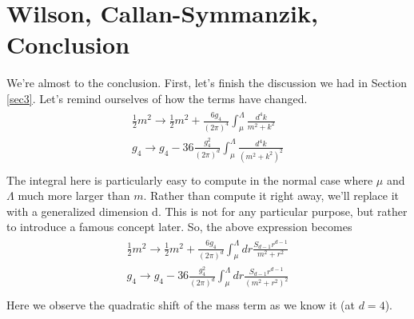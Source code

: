 \documentclass[12pt,halfline,a4paper]{ouparticle}
\begin{document}
\section{Wilson, Callan-Symmanzik, Conclusion}
We're almost to the conclusion. First, let's finish the discussion we had in Section \ref{sec3}.
Let's remind ourselves of how the terms have changed. 
\begin{align}
\begin{split}
	\frac{1}{2}m^2\rightarrow\frac{1}{2} m^2+\frac{6g_4}{(2\pi)^4}\int^\Lambda_\mu\frac{d^4k}{m^2+k^2}\\
	g_4\rightarrow g_4-36\frac{g_4^2}{(2\pi)^d }\int^\Lambda_\mu\frac{d^4k}{(m^2+k^2)^2}\\
\end{split}	
\end{align}
The integral here is particularly easy to compute in the normal case where $\mu$ and $\Lambda$ much more larger than $m$. Rather than compute it right away, we'll replace it with a generalized dimension d. This is not for any particular purpose, but rather to introduce a famous concept later. So, the above expression becomes
\begin{align}
	\begin{split}
		\frac{1}{2}m^2\rightarrow\frac{1}{2} m^2+\frac{6g_4}{(2\pi)^d}\int^\Lambda_\mu dr\frac{S_{d-1}r^{d-1}}{m^2+r^2}\\
		g_4\rightarrow g_4-36\frac{g_4^2}{(2\pi)^d}\int^\Lambda_\mu dr\frac{S_{d-1}r^{d-1}}{(m^2+r^2)^2}\\
	\end{split}	
\end{align}
Here we observe the quadratic shift of the mass term as we know it (at $d=4$).
\end{document}
